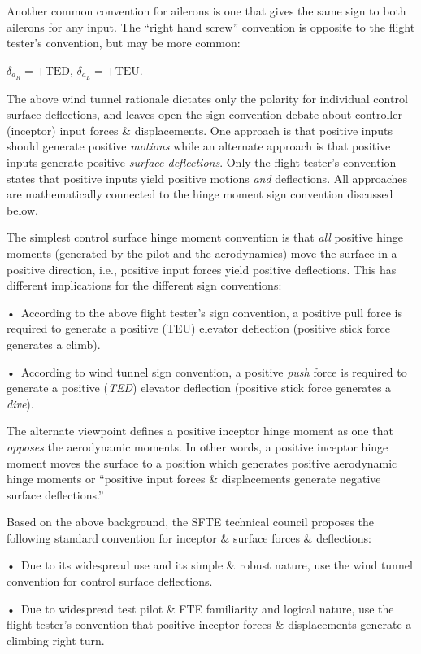 \documentclass[
]{book}
\begin{document}
Another common convention for ailerons is one that gives the same sign to both ailerons for any input. The ``right hand screw'' convention is opposite to the flight tester's convention, but may be more common:

\(\delta_{a_R} = +\mathrm{TED}\), \(\delta_{a_L} = +\mathrm{TEU}\).

The above wind tunnel rationale dictates only the polarity for individual control surface deflections, and leaves open the sign convention debate about controller (inceptor) input forces \& displacements. One approach is that positive inputs should generate positive \emph{motions} while an alternate approach is that positive inputs generate positive \emph{surface deflections}. Only the flight tester's convention states that positive inputs yield positive motions \emph{and} deflections. All approaches are mathematically connected to the hinge moment sign convention discussed below.

The simplest control surface hinge moment convention is that \emph{all} positive hinge moments (generated by the pilot and the aerodynamics) move the surface in a positive direction, i.e., positive input forces yield positive deflections. This has different implications for the different sign conventions:

•~According to the above flight tester's sign convention, a positive pull force is required to generate a positive (TEU) elevator deflection (positive stick force generates a climb).

•~According to wind tunnel sign convention, a positive \emph{push} force is required to generate a positive (\emph{TED}) elevator deflection (positive stick force generates a \emph{dive}).

The alternate viewpoint defines a positive inceptor hinge moment as one that \emph{opposes} the aerodynamic moments. In other words, a positive inceptor hinge moment moves the surface to a position which generates positive aerodynamic hinge moments or ``positive input forces \& displacements generate negative surface deflections.''

Based on the above background, the SFTE technical council proposes the following standard convention for inceptor \& surface forces \& deflections:

•~Due to its widespread use and its simple \& robust nature, use the wind tunnel convention for control surface deflections.

•~Due to widespread test pilot \& FTE familiarity and logical nature, use the flight tester's convention that positive inceptor forces \& displacements generate a climbing right turn.
\end{document}

